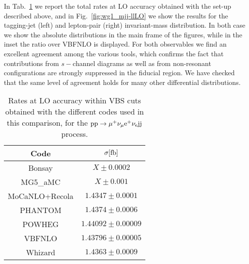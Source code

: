  In Tab.~\ref{tab:wg1_LOrates} we report the total rates at LO accuracy obtained with the set-up described above, and in Fig.~\ref{fig:wg1_mjj-llLO} we show the results
for the tagging-jet (left) and lepton-pair (right) invariant-mass distribution. In both case we show the absolute distributions in the main frame of the 
figures, while in the inset the ratio over {\sc VBFNLO} is displayed. For both observables we find 
an excellent agreement among the various tools, which confirms the fact
that contributions from $s-$channel diagrams as well as from non-resonant configurations are strongly suppressed in the fiducial region. We have checked 
that the same level of agreement holds for many other differential distributions.
\begin{table}[h!]
    \centering
    \begin{tabular}{c|c}
        Code  &  $\sigma[\rm{fb}]$  \\
        \hline
        \hline
        {\sc Bonsay}  &  $X \pm 0.0002$ \\
        {\sc MG5\_aMC}&  $X \pm 0.001$  \\ 
        {\sc MoCaNLO+Recola}  &  $1.4347 \pm 0.0001$ \\
        {\sc PHANTOM}&  $1.4374 \pm 0.0006 $  \\
        {\sc POWHEG}  &  $1.44092 \pm 0.00009$ \\
        {\sc VBFNLO}  &  $1.43796 \pm 0.00005$ \\
        {\sc Whizard}&  $1.4363 \pm 0.0009 $
    \end{tabular}
    \caption{\label{tab:wg1_LOrates} Rates at LO accuracy within VBS cuts obtained with the different codes used in this comparison, 
    for the ${\rm p}{\rm p}\to\mu^+\nu_\mu{\rm e}^+\nu_{\rm e}{\rm j}{\rm j}$ process.}
\end{table}

